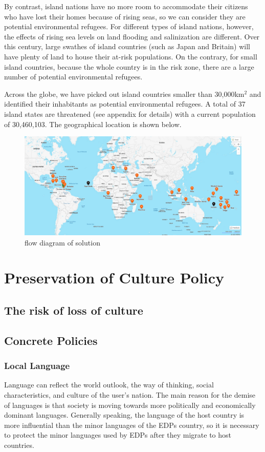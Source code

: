 \documentclass[12pt]{article}  %
\begin{document}
By contrast, island nations have no more room to accommodate their citizens who have lost their homes because of rising seas, so we can consider they are potential environmental refugees.
 For different types of island nations, however, the effects of rising sea levels on land flooding and salinization are different. Over this century, large swathes of island countries (such as Japan and Britain) will have plenty of land to house their at-risk populations. On the contrary, for small island countries, because the whole country is in the risk zone, there are a large number of potential environmental refugees.
 
Across the globe, we have picked out island countries smaller than 30,000km$^2$ and identified their inhabitants as potential environmental refugees. 
A total of 37 island states are threatened (see appendix for details) with a current population of 30,460,103. The geographical location is shown below.


\begin{figure}[htbp]\label{5.2}
	\centering
	\includegraphics[width=.6\textwidth]{5.2.png}
	\caption{ flow diagram of solution}\label{5.2}
\end{figure}




\section{Preservation of Culture Policy}

\subsection{The risk of loss of culture}


\subsection{Concrete Policies}



\subsubsection{Local Language}
Language can reflect the world outlook, the way of thinking, social characteristics, and culture of the user's nation. The main reason for the demise of languages is that society is moving towards more politically and economically dominant languages. Generally speaking, the language of the host country is more influential than the minor languages of the EDPs country, so it is necessary to protect the minor languages used by EDPs after they migrate to host countries.
\end{document}
